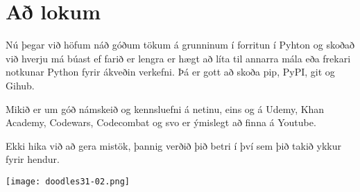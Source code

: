 \section{Að lokum}\label{Að lokum}

Nú þegar við höfum náð góðum tökum á grunninum í forritun í Pyhton og skoðað við hverju má búast ef farið er lengra er hægt að líta til annarra mála eða frekari notkunar Python fyrir ákveðin verkefni.
Þá er gott að skoða pip, PyPI, git og Gihub.

Mikið er um góð námskeið og kennsluefni á netinu, eins og á Udemy, Khan Academy, Codewars, Codecombat og svo er ýmislegt að finna á Youtube.

Ekki hika við að gera mistök, þannig verðið þið betri í því sem þið takið ykkur fyrir hendur. 

	\begin{center}
		\texttt{[image: doodles31-02.png]}
	\end{center}
